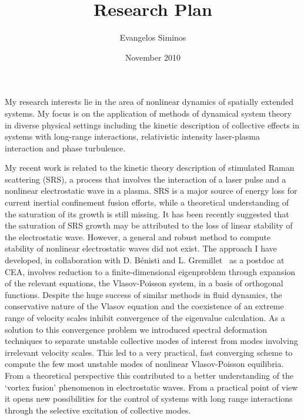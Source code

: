 \documentclass[a4paper,10pt]{article}
\title{Research Plan}
\author{Evangelos Siminos}
\date{November 2010}
\begin{document}
\maketitle

My research interests lie in the area of nonlinear dynamics of 
spatially extended systems. My focus is on the application of methods
of dynamical system theory in diverse physical settings including
the kinetic description of collective effects in 
systems with long-range interactions,
relativistic intensity laser-plasma interaction 
and phase turbulence.

My recent work is related to the kinetic theory description of stimulated 
Raman scattering (SRS), a process that involves the
interaction of a laser pulse and a nonlinear electrostatic wave in a plasma. SRS
is a major source of energy loss for current inertial confinement fusion efforts, while
a theoretical understanding of the saturation of its growth is still missing. It
has been recently suggested that the saturation of SRS growth may be attributed
to the loss of linear stability of the electrostatic wave. However, a general
and robust method to compute stability of nonlinear electrostatic waves did not
exist. The approach I have developed, in collaboration with D. B\'enisti and L.
Gremillet~\cite{siminos11} as a postdoc at CEA, 
involves reduction to a finite-dimensional
eigenproblem through expansion of the relevant equations, the Vlasov-Poisson
system, in a basis of orthogonal functions. Despite the huge success of
similar methods in fluid dynamics, the conservative nature of the Vlasov
equation and the coexistence of an extreme range of velocity scales inhibit
convergence of the eigenvalue calculation. As a solution to this convergence
problem we introduced spectral deformation techniques
to separate unstable collective modes of interest from modes involving 
irrelevant velocity scales. 
This led to a very practical, fast converging scheme to compute the 
few most unstable modes of nonlinear Vlasov-Poisson equilibria.
From a theoretical perspective
this contributed to a better understanding of the `vortex fusion'
phenomenon in electrostatic waves. From a practical point of view it opens 
new possibilities for the control of systems with long range interactions 
through the selective excitation of collective modes.
\end{document}
